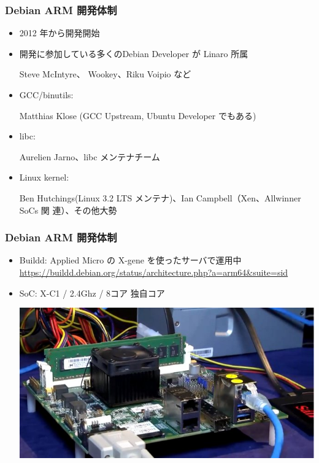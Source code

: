 \documentclass[cjk,dvipdfmx,10pt,compress,%
hyperref={bookmarks=true,bookmarksnumbered=true,bookmarksopen=false,%
colorlinks=false,%
pdftitle={第 103 回 関西 Debian 勉強会},%
pdfauthor={岩松 信洋},%
pdfsubject={資料},%
}]{beamer}
\begin{document}
\begin{frame}[fragile]
  \frametitle{Debian ARM 開発体制}

  \begin{itemize}
  \item 2012 年から開発開始
  \item 開発に参加している多くのDebian Developer が Linaro 所属

   Steve McIntyre、 Wookey、Riku Voipio など

  \item GCC/binutils:

    Matthias Klose (GCC Upstream, Ubuntu Developer でもある)
  \item libc:
    
    Aurelien Jarno、libc メンテナチーム
  \item Linux kernel:

    Ben Hutchings(Linux 3.2 LTS メンテナ)、Ian Campbell（Xen、Allwinner SoCs 関
連）、その他大勢


  \end{itemize}
\end{frame}

\begin{frame}[fragile]
  \frametitle{Debian ARM 開発体制}

  \begin{itemize}
  \item Buildd: Applied Micro の X-gene を使ったサーバで運用中
     \url{https://buildd.debian.org/status/architecture.php?a=arm64&suite=sid}
  \item SoC: X-C1 / 2.4Ghz / 8コア 独自コア

  \begin{center}
  \includegraphics[width=0.7\hsize]{image201511/x-gene.jpg}
  \end{center}

  \end{itemize}
\end{frame}
\end{document}
